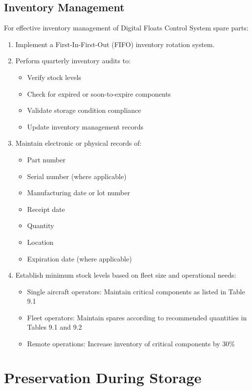 \documentclass[12pt,a4paper,twoside,openright]{book}
\begin{document}
\subsection{Inventory Management}

For effective inventory management of Digital Floats Control System spare parts:

\begin{enumerate}
    \item Implement a First-In-First-Out (FIFO) inventory rotation system.
    \item Perform quarterly inventory audits to:
    \begin{itemize}
        \item Verify stock levels
        \item Check for expired or soon-to-expire components
        \item Validate storage condition compliance
        \item Update inventory management records
    \end{itemize}
    \item Maintain electronic or physical records of:
    \begin{itemize}
        \item Part number
        \item Serial number (where applicable)
        \item Manufacturing date or lot number
        \item Receipt date
        \item Quantity
        \item Location
        \item Expiration date (where applicable)
    \end{itemize}
    \item Establish minimum stock levels based on fleet size and operational needs:
    \begin{itemize}
        \item Single aircraft operators: Maintain critical components as listed in Table 9.1
        \item Fleet operators: Maintain spares according to recommended quantities in Tables 9.1 and 9.2
        \item Remote operations: Increase inventory of critical components by 30\%
    \end{itemize}
\end{enumerate}

\section{Preservation During Storage}
\end{document}
